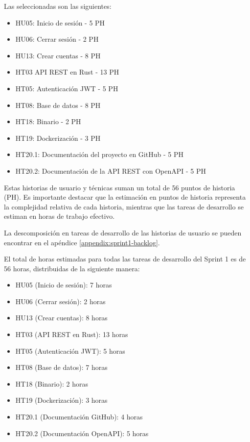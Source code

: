Las seleccionadas son las siguientes:
\begin{itemize}
    \item HU05: Inicio de sesión - 5 PH
    \item HU06: Cerrar sesión - 2 PH
    \item HU13: Crear cuentas - 8 PH
    \item HT03 API REST en Rust - 13 PH
    \item HT05: Autenticación JWT - 5 PH
    \item HT08: Base de datos - 8 PH
    \item HT18: Binario - 2 PH
    \item HT19: Dockerización - 3 PH
    \item HT20.1: Documentación del proyecto en GitHub - 5 PH
    \item HT20.2: Documentación de la API REST con OpenAPI - 5 PH
\end{itemize}

Estas historias de usuario y técnicas suman un total de 56 puntos de historia (PH). Es importante destacar que la estimación en puntos de historia representa la complejidad relativa de cada historia, mientras que las tareas de desarrollo se estiman en horas de trabajo efectivo.

La descomposición en tareas de desarrollo de las historias de usuario se pueden encontrar en el apéndice \ref{appendix:sprint1-backlog}.

El total de horas estimadas para todas las tareas de desarrollo del Sprint 1 es de 56 horas, distribuidas de la siguiente manera:

\begin{itemize}
    \item HU05 (Inicio de sesión): 7 horas
    \item HU06 (Cerrar sesión): 2 horas  
    \item HU13 (Crear cuentas): 8 horas
    \item HT03 (API REST en Rust): 13 horas
    \item HT05 (Autenticación JWT): 5 horas
    \item HT08 (Base de datos): 7 horas
    \item HT18 (Binario): 2 horas
    \item HT19 (Dockerización): 3 horas
    \item HT20.1 (Documentación GitHub): 4 horas
    \item HT20.2 (Documentación OpenAPI): 5 horas
\end{itemize}

